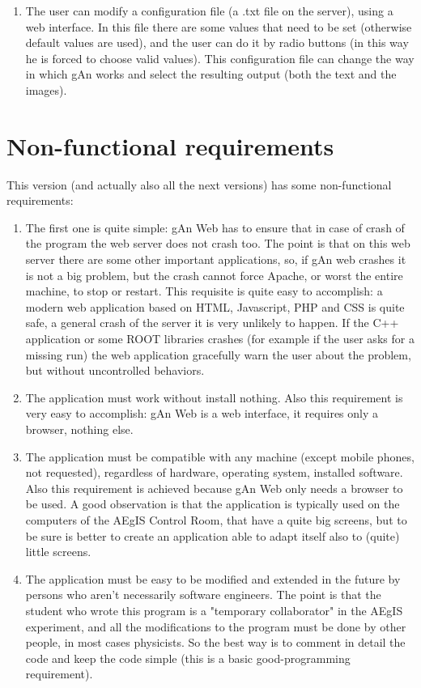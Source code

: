 \begin{enumerate}
\item The user can modify a configuration file (a .txt file on the server), using a web interface. In this file there are some values that need to be set (otherwise default values are used), and the user can do it by radio buttons (in this way he is forced to choose valid values). This configuration file can change the way in which gAn works and select the resulting output (both the text and the images).   

\end{enumerate}

 
\section{Non-functional requirements}

This version (and actually also all the next versions) has some non-functional requirements:

\begin{enumerate}

\item The first one is quite simple: gAn Web has to ensure that in case of crash of the program the web server does not crash too. The point is that on this web server there are some other important applications, so, if gAn web crashes it is not a big problem, but the crash cannot force Apache, or worst the entire machine, to stop or restart. 
This requisite is quite easy to accomplish: a modern web application based on HTML, Javascript, PHP and CSS is quite safe, a general crash of the server it is very unlikely to happen. If the C++ application or some ROOT libraries crashes (for example if the user asks for a missing run) the web application gracefully warn the user about the problem, but without uncontrolled behaviors.  

\item The application must work without install nothing. Also this requirement is very easy to accomplish: gAn Web is a web interface, it requires only a browser, nothing else.

\item The application must be compatible with any machine (except mobile phones, not requested), regardless of hardware, operating system, installed software. Also this requirement is achieved because gAn Web only needs a browser to be used. A good observation is that the application is typically used on the computers of the AEgIS Control Room, that have a quite big screens, but to be sure is better to create an application able to adapt itself also to (quite) little screens.  

\item The application must be easy to be modified and extended in the future by persons who aren't necessarily software engineers. The point is that the student who wrote this program is a "temporary collaborator" in the AEgIS experiment, and all the modifications to the program must be done by other people, in most cases physicists. So the best way is to comment in detail the code and keep the code simple (this is a basic good-programming requirement).   


\end{enumerate}

